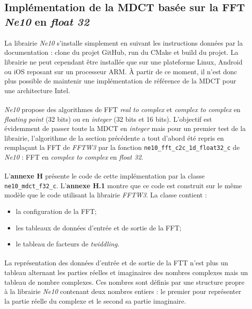 \documentclass{article}
\begin{document}
    \subsection{Implémentation de la MDCT basée sur la FFT \emph{Ne10} en \emph{float 32}}
    \paragraph{}
    La librairie \emph{Ne10} s'installe simplement en suivant les instructions données par la documentation : clone du projet GitHub, run du CMake et build du projet\cite{Ne10}. La librairie ne peut cependant être installée que sur une plateforme Linux, Android ou iOS reposant sur un processeur ARM. À partir de ce moment, il n'est donc plus possible de maintenir une implémentation de référence de la MDCT pour une architecture Intel.

    \paragraph{}
    \emph{Ne10} propose des algorithmes de FFT \emph{real to complex} et \emph{complex to complex} en \emph{floating point} (32 bits) ou en \emph{integer} (32 bits et 16 bits). L'objectif est évidemment de passer toute la MDCT en \emph{integer} mais pour un premier test de la librairie, l'algorithme de la section précédente a tout d'abord été repris en remplaçant la FFT de \emph{FFTW3} par la fonction \texttt{ne10\_fft\_c2c\_1d\_float32\_c} de \emph{Ne10} : FFT en \emph{complex to complex} en \emph{float 32}.

    \paragraph{}
    L'\textbf{annexe H} présente le code de cette implémentation par la classe \texttt{ne10\_mdct\_f32\_c}. L'\textbf{annexe H.1} montre que ce code est construit sur le même modèle que le code utilisant la librairie \emph{FFTW3}. La classe contient :
    \begin{itemize}
        \item la configuration de la FFT;
        \item les tableaux de données d'entrée et de sortie de la FFT;
        \item le tableau de facteurs de \emph{twiddling}.
    \end{itemize}

    \paragraph{}
    La représentation des données d'entrée et de sortie de la FTT n'est plus un tableau alternant les parties réelles et imaginaires des nombres complexes mais un tableau de nombre complexes. Ces nombres sont définis par une structure propre à la librairie \emph{Ne10} contenant deux nombres entiers : le premier pour représenter la partie réelle du complexe et le second sa partie imaginaire.
\end{document}
